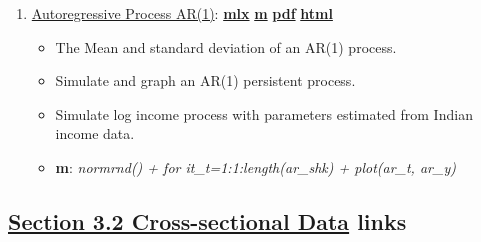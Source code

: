 \documentclass[
]{book}
\providecommand{\tightlist}{%
  \setlength{\itemsep}{0pt}\setlength{\parskip}{0pt}}
\begin{document}
\begin{enumerate}
\def\labelenumi{\arabic{enumi}.}
\tightlist
\item
  \href{https://fanwangecon.github.io/M4Econ/panel/timeseries/htmlpdfm/fs_autoregressive.html}{Autoregressive Process AR(1)}: \href{https://github.com/FanWangEcon/M4Econ/blob/master/panel/timeseries/fs_autoregressive.mlx}{\textbf{mlx}} \textbar{} \href{https://github.com/FanWangEcon/M4Econ/blob/master/panel/timeseries/htmlpdfm/fs_autoregressive.m}{\textbf{m}} \textbar{} \href{https://github.com/FanWangEcon/M4Econ/blob/master/panel/timeseries/htmlpdfm/fs_autoregressive.pdf}{\textbf{pdf}} \textbar{} \href{https://fanwangecon.github.io/M4Econ/panel/timeseries/htmlpdfm/fs_autoregressive.html}{\textbf{html}}

  \begin{itemize}
  \tightlist
  \item
    The Mean and standard deviation of an AR(1) process.
  \item
    Simulate and graph an AR(1) persistent process.
  \item
    Simulate log income process with parameters estimated from Indian income data.
  \item
    \textbf{m}: \emph{normrnd() + for it\_t=1:1:length(ar\_shk) + plot(ar\_t, ar\_y)}
  \end{itemize}
\end{enumerate}

\hypertarget{section-3.2-cross-sectional-datacross-sectional-data-links}{%
\subsection{\texorpdfstring{\protect\hyperlink{cross-sectional-data}{Section 3.2 Cross-sectional Data} links}{Section 3.2 Cross-sectional Data links}}\label{section-3.2-cross-sectional-datacross-sectional-data-links}}
\end{document}
